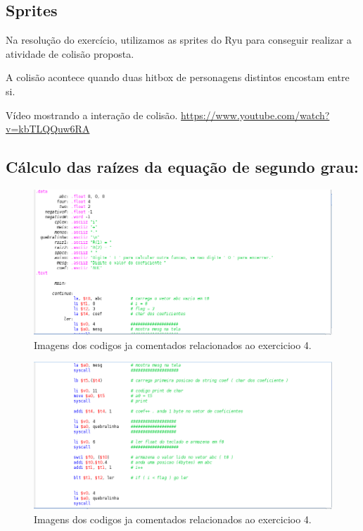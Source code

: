 \documentclass[12pt]{article}
\begin{document}
\subsection{Sprites}
\label{subsec:sprites}
	Na resolução do exercício, utilizamos as sprites do Ryu para conseguir realizar a atividade de colisão proposta. 
	
	A colisão acontece quando duas hitbox de personagens distintos encostam entre si.
	
	Vídeo mostrando a interação de colisão. \url{https://www.youtube.com/watch?v=kbTLQQuw6RA}
		

\subsection{ Cálculo das raízes da equação de segundo grau:}
\label{subsec:sprites}

\begin{figure}[H]
	\centering
	\includegraphics[width=1\textwidth]{EX_4_1.png}
	\caption{Imagens dos codigos ja comentados relacionados ao exercicioo 4.}
\end{figure}

\begin{figure}[H]
	\centering
	\includegraphics[width=1\textwidth]{EX_4_2.png}
	\caption{Imagens dos codigos ja comentados relacionados ao exercicioo 4.}
	\label{fig:hilo}
\end{figure}
\end{document}
